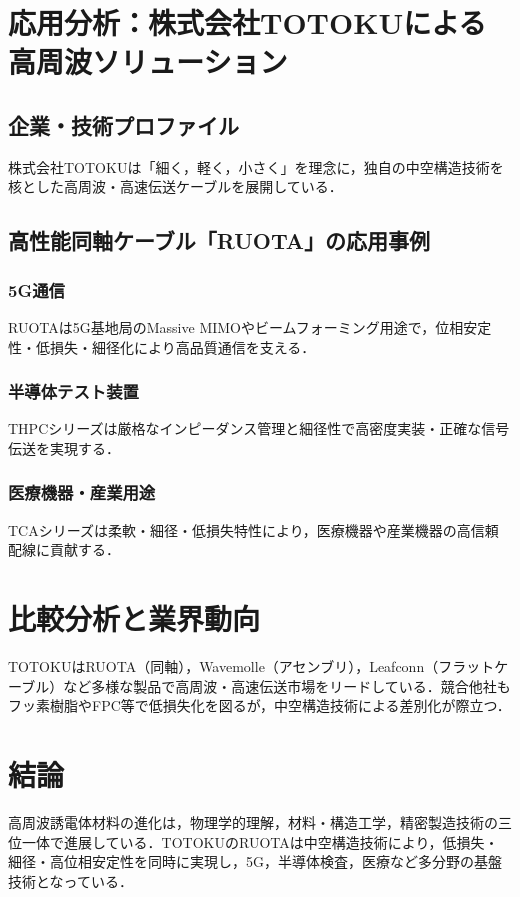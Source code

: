 \documentclass[11pt,a4paper]{ltjsarticle} %
\begin{document}
\section{応用分析：株式会社TOTOKUによる高周波ソリューション}
\subsection{企業・技術プロファイル}
株式会社TOTOKUは「細く，軽く，小さく」を理念に，独自の中空構造技術を核とした高周波・高速伝送ケーブルを展開している．

\subsection{高性能同軸ケーブル「RUOTA」の応用事例}
\subsubsection{5G通信}
RUOTAは5G基地局のMassive MIMOやビームフォーミング用途で，位相安定性・低損失・細径化により高品質通信を支える．

\subsubsection{半導体テスト装置}
THPCシリーズは厳格なインピーダンス管理と細径性で高密度実装・正確な信号伝送を実現する．

\subsubsection{医療機器・産業用途}
TCAシリーズは柔軟・細径・低損失特性により，医療機器や産業機器の高信頼配線に貢献する．


\section{比較分析と業界動向}
TOTOKUはRUOTA（同軸），Wavemolle（アセンブリ），Leafconn（フラットケーブル）など多様な製品で高周波・高速伝送市場をリードしている．競合他社もフッ素樹脂やFPC等で低損失化を図るが，中空構造技術による差別化が際立つ．

\section{結論}
高周波誘電体材料の進化は，物理学的理解，材料・構造工学，精密製造技術の三位一体で進展している．TOTOKUのRUOTAは中空構造技術により，低損失・細径・高位相安定性を同時に実現し，5G，半導体検査，医療など多分野の基盤技術となっている．
\end{document}
